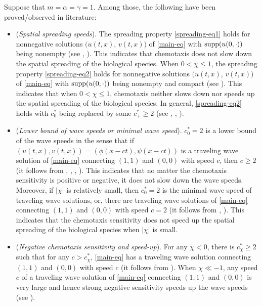 \documentclass[11pt]{article} %
\theoremstyle{remark}
\theoremstyle{remark}
\numberwithin{equation}{section}
\numberwithin{figure}{section}
\numberwithin{table}{section}
\begin{document}
 Suppose that $m=\alpha=\gamma=1$.   Among those, the following have been proved/observed  in literature:


\begin{itemize}

\item  ({\it Spatial spreading speeds}).  The spreading property \eqref{spreading-eq1}   holds for nonnegative solutions $(u(t,x)$, $v(t,x))$ of \eqref{main-eq} with ${\rm supp} (u(0,\cdot))$ being nonempty 
(see \cite[Theorem 1.1]{HaHe2020},  \cite[Theorem 1.1]{SaShXu2019}).  This indicates that chemotaxis does not slow down the spatial spreading of the biological species.  When $0<\chi\le 1$, the spreading property \eqref{spreading-eq2} holds for nonnegative solutions $(u(t,x)$, $v(t,x))$ of \eqref{main-eq} with ${\rm supp} (u(0,\cdot))$ being nonempty and compact (see \cite[Theorem 1.1]{SaShXu2019}). This indicates that when $0<\chi\le 1$,  chemotaxis neither slows down nor speeds up the spatial spreading of the biological species. In general,  \eqref{spreading-eq2} holds 
 with $c_0^*$ being replaced by some $c_+^*\ge 2$ (see \cite[Theorem 1.1]{HaHe2020}, \cite[Theorem B]{SaSh2017-1},  \cite[Theorem C]{SaSh2020}).


\item   ({\it Lower bound of wave speeds or minimal wave speed}). 
{$c_0^*=2$ is a lower bound of the wave speeds in the sense that  if $(u(t,x),v(t,x))=(\phi(x-ct),\psi(x-ct))$ is a traveling wave solution of \eqref{main-eq} connecting $(1,1)$ and $(0,0)$ with speed $c$, then $c\ge 2$}  (it follows from \cite[Theorem 1.2]{HaHe2020}, \cite[Proposition 1.3]{Hen2022},  \cite[Theorem 1.2]{HeRe2024},  \cite[Theorem C]{SaSh2020}). This indicates that no matter the chemotaxis sensitivity is positive or negative, it does not slow down the wave speeds.
Moreover, {if $|\chi|$ is relatively small, then $c_0^*=2$ is the minimal wave speed of traveling wave solutions, or, there are  traveling wave solutions  of \eqref{main-eq} connecting $(1,1)$ and $(0,0)$ with speed $c= 2$} 
(it follows from \cite[Theorem 1.4]{Hen2022}, \cite[Theorem 1.4]{SaShXu2019}). This indicates that the chemotaxis sensitivity does not speed up the spatial spreading of the biological species when $|\chi|$ is small.



\item  ({\it Negative chemotaxis sensitivity and speed-up}). 
{For any $\chi<0$, there is $c_{\chi}^*\ge 2$ such that for any $c>c_{\chi}^*$, \eqref{main-eq} has a traveling wave solution connecting $(1,1)$ and $(0,0)$ with speed $c$}
(it follows from \cite[Theorem A]{SaSh2020}).  
When $\chi\ll -1$, any speed $c$ of a traveling wave solution of \eqref{main-eq} connecting
$(1,1)$ and $(0,0)$ is very large  and hence strong negative sensitivity speeds up the wave speeds
(see \cite[Theorem 2.1]{GrHeTu2023}).



\end{itemize}
\end{document}
